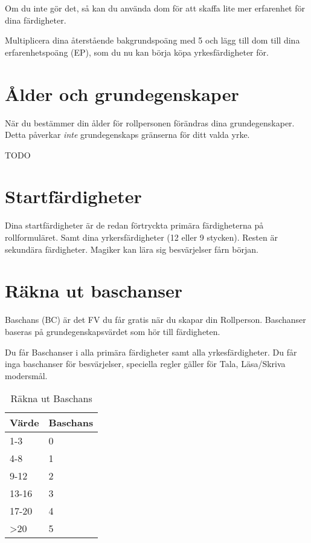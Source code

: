 \documentclass[a4paper, 10pt, titlepage]{article}
\begin{document}
Om du inte gör det, så kan du använda dom för att skaffa lite mer erfarenhet
för dina färdigheter.

Multiplicera dina återstående bakgrundspoäng med 5 och lägg till dom till dina
erfarenhetspoäng (EP), som du nu kan börja köpa yrkesfärdigheter för.

\section{Ålder och grundegenskaper}

När du bestämmer din ålder för rollpersonen förändras dina grundegenskaper. Detta
påverkar \textit{inte}  grundegenskaps gränserna för ditt valda yrke.

TODO

\section{Startfärdigheter}
Dina startfärdigheter är de redan förtryckta primära färdigheterna på rollformuläret.
Samt dina yrkersfärdigheter (12 eller 9 stycken). Resten är sekundära färdigheter.
Magiker kan lära sig besvärjelser fårn början.

\section{Räkna ut baschanser}
Baschans (BC) är det FV du får gratis när du skapar din Rollperson. Baschanser baseras
på grundegenskapsvärdet som hör till färdigheten.

Du får Baschanser i alla primära färdigheter samt alla yrkesfärdigheter.
Du får inga baschanser för besvärjelser, speciella regler gäller för Tala,
Läsa/Skriva modersmål.

\begin{table}[hbp]
  \caption{Räkna ut Baschans}
  \begin{tabular}{|l|l|}
    \hline
    Värde & Baschans \\
    \hline
    1-3   & 0 \\
    \hline
    4-8   & 1 \\
    \hline
    9-12  & 2 \\
    \hline
    13-16 & 3 \\
    \hline
    17-20 & 4 \\
    \hline
    >20   & 5 \\
    \hline
  \end{tabular}
\end{table}
\end{document}

